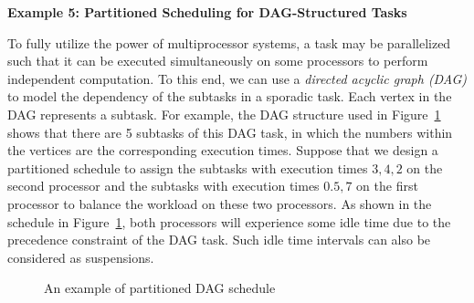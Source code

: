 {\bf Example 5: Partitioned Scheduling for DAG-Structured Tasks}

To fully utilize the power of multiprocessor systems, a task may be parallelized such that it can be executed simultaneously on some processors to perform independent computation. To this end, we can use a \emph{directed acyclic graph (DAG)} to model the dependency of the subtasks in a sporadic task. Each vertex in the DAG represents a subtask. For example, the DAG structure used in Figure~\ref{fig:example-dac} shows that there are 5 subtasks of this DAG task, in which the numbers within the vertices are the corresponding execution times. Suppose that we design a partitioned schedule to assign the subtasks with execution times $3,4,2$ on the second processor and the subtasks with execution times $0.5, 7$ on the first processor to balance the workload on these two processors. As shown in the schedule in Figure~\ref{fig:example-dac}, both processors will experience some idle time 
due to the precedence constraint of the DAG task. Such idle time intervals can also be considered as suspensions. 




\begin{figure}[t]
  \centering
  \caption{An example of partitioned DAG schedule}
  \label{fig:example-dac}
\end{figure}


